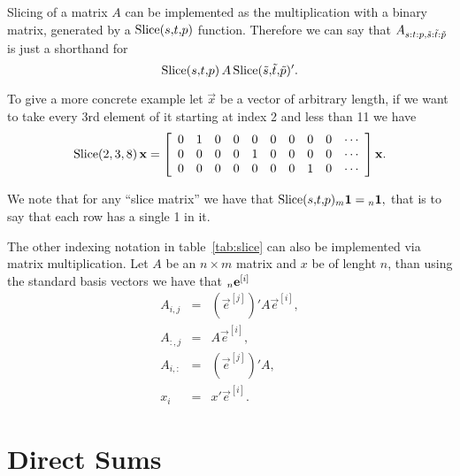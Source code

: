 \documentclass{sapthesis}
\begin{document}
Slicing of a matrix \(A\) can be implemented as the multiplication with a
binary matrix, generated by a \(\mathrm{Slice}({s}{,}{t}{,}{p})\) function. Therefore we can say
that \(A_{{s}{:}{t}{:}{p},\tilde{s}{:}\tilde{t}{:}\tilde{p}}\) is just a shorthand for \[\mathrm{Slice}({s}{,}{t}{,}{p}) \, A
\, \mathrm{Slice}(\tilde{s}{,}\tilde{t}{,}\tilde{p})'.\]

To give a more concrete example let \(\vec x\) be a vector of arbitrary length, if we
want to take every 3rd element of it starting at index 2 and less than 11 we
have \[\mathrm{Slice}(2,3,8) \, \mathbf{x}
= \left[\begin{array}{cccccccccc}
    0&1&0&0&0&0&0&0&0&\cdots\\
    0&0&0&0&1&0&0&0&0&\cdots\\
    0&0&0&0&0&0&0&1&0&\cdots
\end{array}\right] \mathbf{x}.\]

We note that for any ``slice matrix'' we have that \(\slice(\sss,{}) \leftidx{_m}{\vec 1}{} =
\leftidx{_n}{\vec 1}{},\) that is to say that each row has a single 1 in it.

The other indexing notation in table~\ref{tab:slice} can also be implemented via
matrix multiplication. Let \(A\) be an \(n \times m\) matrix and \(x\) be of
lenght \(n\), than using the standard basis vectors we have that
\(\leftidx{_n}{\vec e}{^{[i]}}\)
\begin{eqnarray*}
    A_{i,j} &=& \left(\vec e^{[j]}\right)' A \vec e^{[i]}, \\
    A_{:,j} &=& A \vec e^{[i]}, \\
    A_{i,:} &=& \left(\vec e^{[j]}\right)' A, \\
    x_i     &=& x' \vec e^{[i]}.
\end{eqnarray*}

\chapter{Direct Sums}\label{sec:direct-sums}

\newcommand{\Z}{\phantom{{}'}\vec 0 \vec 0'}
\end{document}
